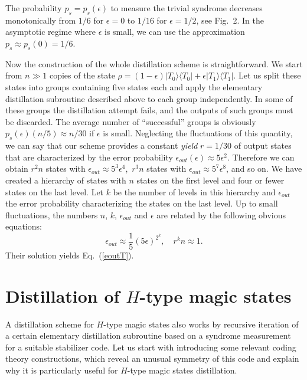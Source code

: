 \documentclass[pra,twocolumn,showpacs]{revtex4}
\newcommand{\la}{\langle}
\newcommand{\ra}{\rangle}
\newcommand{\ep}{\epsilon}
\newcommand{\Hh}{$H$}
\begin{document}
The probability $p_s=p_s(\ep)$ to measure the trivial syndrome decreases
monotonically from $1/6$ for $\ep=0$ to $1/16$ for $\ep=1/2$, see Fig.~2. In
the asymptotic regime where $\ep$ is small, we can use the approximation
$p_s\approx p_s(0)=1/6$.

Now the construction of the whole distillation scheme is straightforward.  We
start from $n\gg 1$ copies of the state $\rho = (1-\epsilon)|T_0\ra \la T_0| +
\epsilon |T_1\ra\la T_1|$.  Let us split these states into groups containing
five states each and apply the elementary distillation subroutine described
above to each group independently. In some of these groups the distillation
attempt fails, and the outputs of such groups must be discarded. The average
number of ``successful'' groups is obviously $p_s(\ep) (n/5) \approx n/30$ if
$\ep$ is small. Neglecting the fluctuations of this quantity, we can say that
our scheme provides a constant {\it yield} $r=1/30$ of output states that are
characterized by the error probability $\ep_{out}(\ep)\approx 5 \ep^2$.
Therefore we can obtain $r^2 n$ states with $\ep_{out}\approx 5^3 \ep^4$,\,
$r^3 n$ states with $\ep_{out}\approx5^7\ep^{8}$, and so on. We have created a
hierarchy of states with $n$ states on the first level and four or fewer
states on the last level. Let $k$ be the number of levels in this hierarchy
and $\ep_{out}$ the error probability characterizing the states on the last
level.  Up to small fluctuations, the numbers $n$, $k$, $\ep_{out}$ and $\ep$
are related by the following obvious equations:
\begin{equation}
\ep_{out} \approx \frac{1}{5} (5\ep)^{2^k}, \quad r^k n \approx 1.
\end{equation}
Their solution yields Eq.~(\ref{eoutT}).

\section{\label{sec:H} Distillation of \Hh-type magic states}

A distillation scheme for \Hh-type magic states also works by recursive
iteration of a certain elementary distillation subroutine based on a syndrome
measurement for a suitable stabilizer code. Let us start with introducing some
relevant coding theory constructions, which reveal an unusual symmetry of this
code and explain why it is particularly useful for \Hh-type magic states
distillation.
\end{document}
